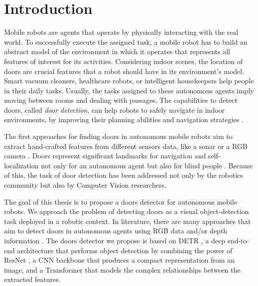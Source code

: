 
\hypertarget{Introduzione}{%
	\chapter{Introduction}\label{header-n3}}

Mobile robots are agents that operate by physically interacting with the real world. To successfully execute the assigned task, a mobile robot has to build an abstract model of the environment in which it operates that represents all features of interest for its activities. Considering indoor scenes, the location of doors are crucial features that a robot should have in its environment's model.  Smart vacuum cleaners, healthcare robots, or intelligent housekeepers help people in their daily tasks. Usually, the tasks assigned to these autonomous agents imply moving between rooms and dealing with passages. The capabilities to detect doors, called \emph{door detection}, can help robots to safely navigate in indoor environments, by improving their planning abilities and navigation strategies \cite{sonarandivisualdoordetection, doorsandnavigation, humanoid}. 

The first approaches for finding doors in autonomous mobile robots aim to extract hand-crafted features from different sensors data, like a sonar \cite{sonarandivisualdoordetection} or a RGB camera \cite{humanoid}. Doors represent significant landmarks for navigation and self-localization not only for an autonomous agent but also for blind people \cite{edgeandcornerdoorsdetector}. Because of this, the task of door detection has been addressed not only by the robotics community but also by Computer Vision researchers. 

The goal of this thesis is to propose a doors detector for autonomous mobile robots. We approach the problem of detecting doors as a visual object-detection task deployed in a robotic context. In literature, there are many approaches that aim to detect doors in autonomous agents using RGB data \cite{doorsandnavigation, detectdoorsfeature} and/or depth information \cite{doorcabinet}. The doors detector we propose is based on DETR \cite{detr}, a deep end-to-end architecture that performs object detection by combining the power of ResNet \cite{resnet}, a CNN backbone that produces a compact representation from an image, and a Transformer \cite{transformer} that models the complex relationships between the extracted features.

